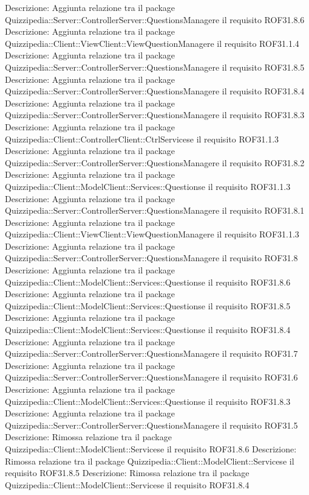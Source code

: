 Descrizione: Aggiunta relazione tra il package Quizzipedia::Server::ControllerServer::QuestionsManagere il requisito ROF31.8.6 
Descrizione: Aggiunta relazione tra il package Quizzipedia::Client::ViewClient::ViewQuestionManagere il requisito ROF31.1.4 
Descrizione: Aggiunta relazione tra il package Quizzipedia::Server::ControllerServer::QuestionsManagere il requisito ROF31.8.5 
Descrizione: Aggiunta relazione tra il package Quizzipedia::Server::ControllerServer::QuestionsManagere il requisito ROF31.8.4 
Descrizione: Aggiunta relazione tra il package Quizzipedia::Server::ControllerServer::QuestionsManagere il requisito ROF31.8.3 
Descrizione: Aggiunta relazione tra il package Quizzipedia::Client::ControllerClient::CtrlServicese il requisito ROF31.1.3 
Descrizione: Aggiunta relazione tra il package Quizzipedia::Server::ControllerServer::QuestionsManagere il requisito ROF31.8.2 
Descrizione: Aggiunta relazione tra il package Quizzipedia::Client::ModelClient::Services::Questionse il requisito ROF31.1.3 
Descrizione: Aggiunta relazione tra il package Quizzipedia::Server::ControllerServer::QuestionsManagere il requisito ROF31.8.1 
Descrizione: Aggiunta relazione tra il package Quizzipedia::Client::ViewClient::ViewQuestionManagere il requisito ROF31.1.3 
Descrizione: Aggiunta relazione tra il package Quizzipedia::Server::ControllerServer::QuestionsManagere il requisito ROF31.8 
Descrizione: Aggiunta relazione tra il package Quizzipedia::Client::ModelClient::Services::Questionse il requisito ROF31.8.6 
Descrizione: Aggiunta relazione tra il package Quizzipedia::Client::ModelClient::Services::Questionse il requisito ROF31.8.5 
Descrizione: Aggiunta relazione tra il package Quizzipedia::Client::ModelClient::Services::Questionse il requisito ROF31.8.4 
Descrizione: Aggiunta relazione tra il package Quizzipedia::Server::ControllerServer::QuestionsManagere il requisito ROF31.7 
Descrizione: Aggiunta relazione tra il package Quizzipedia::Server::ControllerServer::QuestionsManagere il requisito ROF31.6 
Descrizione: Aggiunta relazione tra il package Quizzipedia::Client::ModelClient::Services::Questionse il requisito ROF31.8.3 
Descrizione: Aggiunta relazione tra il package Quizzipedia::Server::ControllerServer::QuestionsManagere il requisito ROF31.5 
Descrizione: Rimossa relazione tra il package Quizzipedia::Client::ModelClient::Servicese il requisito ROF31.8.6 
Descrizione: Rimossa relazione tra il package Quizzipedia::Client::ModelClient::Servicese il requisito ROF31.8.5 
Descrizione: Rimossa relazione tra il package Quizzipedia::Client::ModelClient::Servicese il requisito ROF31.8.4 
